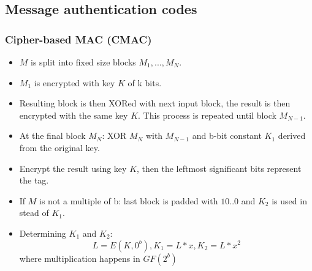 \documentclass[12pt]{article}
\begin{document}
 \subsection{Message authentication codes}
 \subsubsection{Cipher-based MAC (CMAC)}
 \begin{itemize}
 	\item $M$ is split into fixed size blocks $M_1, ..., M_N$.
 	\item $M_1$ is encrypted with key $K$ of k bits.
 	\item Resulting block is then XORed with next input block, the result is then encrypted with the same key $K$. This process is repeated until block $M_{N-1}$.
 	\item At the final block $M_N$: XOR $M_N$ with $M_{N-1}$ and b-bit constant $K_1$ derived from the original key.
 	\item Encrypt the result using key $K$, then the leftmost significant bits represent the tag.
 	\item If $M$ is not a multiple of b: last block is padded with $10..0$ and $K_2$ is used in stead of $K_1$.
 	\item Determining $K_1$ and $K_2$: 
 	\begin{equation*}
 		L = E(K, 0^b), K_1 = L*x, K_2 = L*x^2 
 	\end{equation*}
 	where multiplication happens in $GF(2^b)$
 \end{itemize}
 
\end{document}
